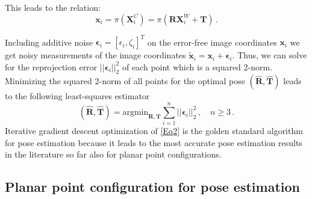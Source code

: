 \documentclass[letterpaper, 10 pt, conference]{ieeeconf}  %
\begin{document}
This leads to the relation:
\begin{equation}
\label{Eq1}
 \mathbf{x}_i = \pi(\mathbf{X}_i^{C}) = \pi(\mathbf{R}\mathbf{X}_i^{W}+\mathbf{T})\,.
\end{equation}

Including additive noise $\bm{\epsilon}_i = [\epsilon_i, \zeta_i]^T$ on the error-free image coordinates $\mathbf{x}_i$ we get noisy measurements of the image coordinates
$\tilde{\mathbf{x}}_i = \mathbf{x}_i + \bm{\epsilon}_i$.
Thus, we can solve for the reprojection error $|\!|\bm{\epsilon}_i|\!|_2^2$ of each point
which is a squared 2-norm. Minimizing the squared 2-norm of all points for the optimal pose $(\hat{\mathbf{R}}, \hat{\mathbf{T}})$ leads to the following least-squares estimator
\begin{equation}
\label{Eq2}
 (\hat{\mathbf{R}}, \hat{\mathbf{T}}) = \text{argmin}_{\mathbf{R}, \mathbf{T}} 
 \sum\limits_{i=1}^n |\!|\bm{\epsilon}_i|\!|_2^2\, , \quad n \geq 3 \,.
\end{equation}
Iterative gradient descent optimization of \eqref{Eq2} is the golden standard algorithm for pose estimation because it leads to the most accurate pose estimation results in the literature so far
also for planar point configurations.

\subsection{Planar point configuration for pose estimation}
\end{document}
